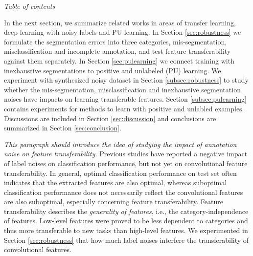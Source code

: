 
\noindent \textit{Table of contents}

\noindent
In the next section, we summarize related works in areas of transfer learning, deep learning with noisy labels and PU learning.
In Section \ref{sec:robustness} we formulate the segmentation errors into three categories, mis-segmentation, misclassification and incomplete annotation, and test feature transferability against them separately.
In Section \ref{sec:pulearning} we connect training with inexhaustive segmentations to positive and unlabeled (PU) learning.
We experiment with synthesized noisy dataset in Section \ref{subsec:robustness} to study whether the mis-segmentation, misclassification and inexhaustive segmentation noises have impacts on learning transferable features.
Section \ref{subsec:pulearning} contains experiments for methods to learn with positive and unlabled examples.
Discussions are included in Section \ref{sec:discussion} and conclusions are summarized in Section \ref{sec:conclusion}.


\noindent \textit{This paragraph should introduce the idea of studying the impact of annotation noise on feature transferability.}
\noindent
Previous studies\cite{sukhbaatar2014training,patrini2016making} have reported a negative impact of label noises on classification performance, but not yet on convolutional feature transferability.
In general, optimal classification performance on test set often indicates that the extracted features are also optimal, whereas suboptimal classification performance does not necessarily reflect the convolutional features are also suboptimal, especially concerning feature transferability.
Feature transferability describes the \textit{generality of features}, i.e., the category-independence of features.
Low-level features were proved to be less dependent to categories and thus more transferable to new tasks than high-level features. \cite{yosinski2014transferable}
We experimented in Section \ref{sec:robustness} that how much label noises interfere the transferability of convolutional features.
